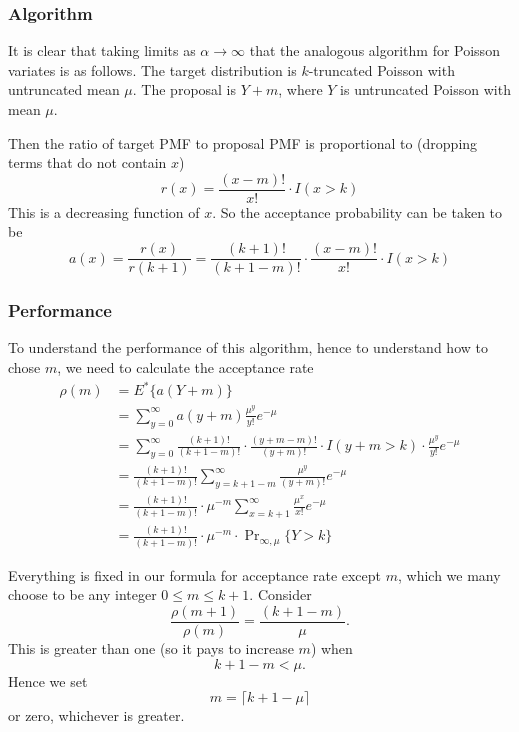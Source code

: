 \documentclass[11pt]{article}
\newcommand{\Prsub}[1]{\Pr\nolimits_{#1}}
\begin{document}
\subsubsection{Algorithm}

It is clear that taking limits as $\alpha \to \infty$
that the analogous algorithm for Poisson variates is as follows.
The target distribution is $k$-truncated Poisson with untruncated
mean $\mu$.  The proposal is $Y + m$, where $Y$ is untruncated Poisson
with mean $\mu$.

Then the ratio of target PMF to proposal PMF is proportional to
(dropping terms that do not contain $x$)
$$
   r(x)
   =
   \frac { (x - m) !} {x !} \cdot I(x > k)
$$
This is a decreasing function of $x$.
So the acceptance probability can be taken to be
$$
   a(x)
   =
   \frac{r(x)}{r(k + 1)}
   =
   \frac {(k + 1) !} { (k + 1 - m) !}
   \cdot
   \frac { (x - m) !} {x !}
   \cdot
   I(x > k)
$$

\subsubsection{Performance}

To understand the performance of this algorithm, hence to understand how
to chose $m$, we need to calculate the acceptance rate
\begin{align*}
   \rho(m)
   & =
   E^* \{ a(Y + m) \}
   \\
   & =
   \sum_{y = 0}^\infty a(y + m) \frac{\mu^y}{y !} e^{- \mu}
   \\
   & =
   \sum_{y = 0}^\infty
   \frac {(k + 1) !} { (k + 1 - m) !}
   \cdot
   \frac { (y + m - m) !} {(y + m) !}
   \cdot
   I(y + m > k)
   \cdot
   \frac{\mu^y}{y !} e^{- \mu}
   \\
   & =
   \frac {(k + 1) !} { (k + 1 - m) !}
   \sum_{y = k + 1 - m}^\infty
   \frac{\mu^y} {(y + m) !} e^{- \mu}
   \\
   & =
   \frac {(k + 1) !} { (k + 1 - m) !}
   \cdot
   \mu^{- m}
   \sum_{x = k + 1}^\infty
   \frac{\mu^x} {x !} e^{- \mu}
   \\
   & =
   \frac {(k + 1) !} { (k + 1 - m) !}
   \cdot
   \mu^{- m}
   \cdot
   \Prsub{\infty, \mu}\{ Y > k \}
\end{align*}

Everything is fixed in our formula for acceptance rate except $m$,
which we many choose to be any integer $0 \le m \le k + 1$.  Consider
$$
   \frac{\rho(m + 1)}{\rho(m)}
   =
   \frac{(k + 1 - m)}{\mu}.
$$
This is greater than one (so it pays to increase $m$) when
$$
   k + 1 - m < \mu.
$$
Hence we set
$$
   m = \lceil k + 1 - \mu \rceil
$$
or zero, whichever is greater.
\end{document}
